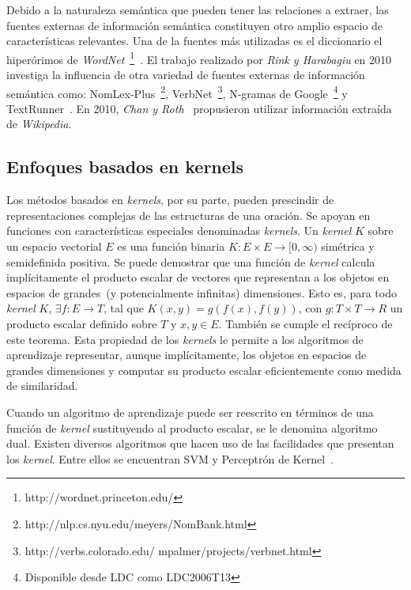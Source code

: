 Debido a la naturaleza semántica que pueden tener las relaciones a extraer, las fuentes externas de información semántica constituyen otro amplio espacio de características relevantes.
Una de la fuentes más utilizadas es el diccionario el hiperórimos de \textit{WordNet}~\footnote{http://wordnet.princeton.edu/}~\cite{guodong2005exploring, rink2010utd}.
El trabajo realizado por \textit{Rink y Harabagiu} en 2010~\cite{rink2010utd} investiga la influencia de otra variedad de fuentes externas de información semántica como: NomLex-Plus~\footnote{http://nlp.cs.nyu.edu/meyers/NomBank.html}, VerbNet~\footnote{http://verbs.colorado.edu/ mpalmer/projects/verbnet.html}, N-gramas de Google~\footnote{Disponible desde LDC como LDC2006T13} y TextRunner~\cite{yates2007textrunner}.
En 2010, \textit{Chan y Roth}~\cite{chan2010exploiting} propusieron utilizar información extraída de \textit{Wikipedia}.

\subsection{Enfoques basados en kernels}

Los métodos basados en \textit{kernels}, por su parte, pueden prescindir de representaciones complejas de las estructuras de una oración. 
Se apoyan en funciones con características especiales denominadas \textit{kernels}.
Un \textit{kernel} $K$ sobre un espacio vectorial $E$ es una función binaria $K:E\times E\rightarrow [0,\infty)$ simétrica y semidefinida positiva.
Se puede demostrar que una función de \textit{kernel} calcula implícitamente el producto escalar de vectores que representan a los objetos en espacios de grandes~(y potencialmente infinitas) dimensiones.
Esto es, para todo \textit{kernel} $K$, $\exists f:E\rightarrow T$, tal que $K(x,y)=g(f(x),f(y))$, con $g:T\times T \rightarrow R$ un producto escalar definido sobre $T$ y $x,y\in E$. También se cumple el recíproco de este teorema.
Esta propiedad de los \textit{kernels} le permite a los algoritmos de aprendizaje representar, aunque implícitamente, los objetos en espacios de grandes dimensiones y computar su producto escalar eficientemente como medida de similaridad.

Cuando un algoritmo de aprendizaje puede ser reescrito en términos de una función de \textit{kernel} sustituyendo al producto escalar, se le denomina algoritmo dual.
Existen diversos algoritmos que hacen uso de las facilidades que presentan los \textit{kernel}.
Entre ellos se encuentran SVM y Perceptrón de Kernel~\cite{aizerman1964theoretical}.

